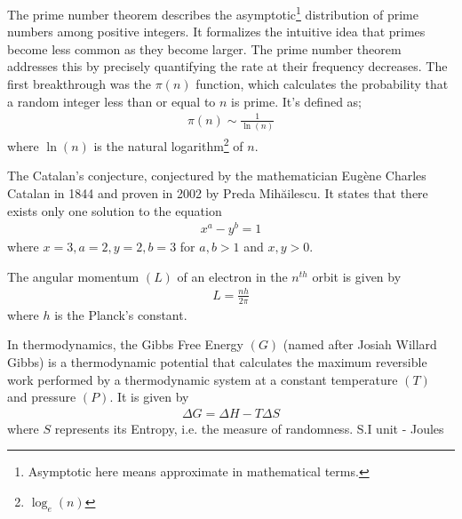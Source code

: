 \begin{mathbox}{}
{The prime number theorem describes the asymptotic\footnote{Asymptotic here means approximate in mathematical terms.} distribution of prime numbers among positive integers. It formalizes the intuitive idea that primes become less common as they become larger. The prime number theorem addresses this by precisely quantifying the rate at their frequency decreases. The first breakthrough was the $\pi(n)$ function, which calculates the probability that a random integer less than or equal to $n$ is prime. It's defined as;
\begin{align*}
    \pi(n) \sim \frac{1}{\ln(n)}
\end{align*}
where $\ln (n)$ is the natural logarithm\footnote{$\log_e(n)$} of $n$.}
\end{mathbox}
\begin{mathbox}{}
{The Catalan's conjecture, conjectured by the mathematician Eugène Charles Catalan in 1844 and proven in 2002 by Preda Mihăilescu. It states that there  exists only one solution to the equation
\begin{align*} 
    x^a - y^b = 1
\end{align*} 
where $x=3, a=2, y=2, b=3$ for {$a,b > 1$} and {$x,y > 0$}.}
\end{mathbox}
\begin{phybox}{}
{The {angular momentum} $(L)$ of an {electron} in the $n^{th}$ orbit is given by 
\begin{align*} 
    L = \frac{nh}{2\pi} 
\end{align*} where $h$ is the {Planck's constant}.}
\end{phybox}
\begin{chembox}{}
{In thermodynamics, the {Gibbs Free Energy} $(G)$ (named after Josiah Willard Gibbs) is a {thermodynamic potential} that calculates the {maximum reversible work} performed by a thermodynamic system at a {constant temperature} $(T)$ and pressure{} $(P)$. It is given by 
\begin{align*} 
    \Delta G=\Delta H-T\Delta S 
\end{align*} where $S$ represents its {Entropy}, i.e. the measure of randomness. {S.I unit - Joules}}
\end{chembox}
